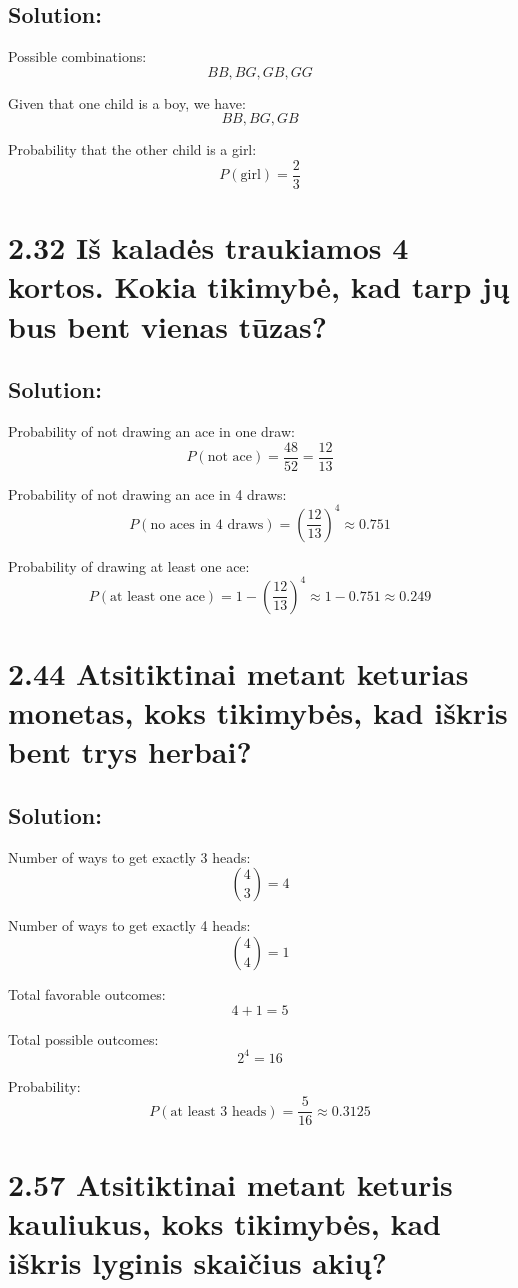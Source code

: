 \documentclass{article}
\begin{document}
{\subsection*{Solution:}
Possible combinations:
\[
BB, BG, GB, GG
\]

Given that one child is a boy, we have:
\[
BB, BG, GB
\]

Probability that the other child is a girl:
\[
P(\text{girl}) = \frac{2}{3}
\]

\section*{2.32 Iš kaladės traukiamos 4 kortos. Kokia tikimybė, kad tarp jų bus bent vienas tūzas?}
\subsection*{Solution:}
Probability of not drawing an ace in one draw:
\[
P(\text{not ace}) = \frac{48}{52} = \frac{12}{13}
\]

Probability of not drawing an ace in 4 draws:
\[
P(\text{no aces in 4 draws}) = \left(\frac{12}{13}\right)^4 \approx 0.751
\]

Probability of drawing at least one ace:
\[
P(\text{at least one ace}) = 1 - \left(\frac{12}{13}\right)^4 \approx 1 - 0.751 \approx 0.249
\]

\section*{2.44 Atsitiktinai metant keturias monetas, koks tikimybės, kad iškris bent trys herbai?}
\subsection*{Solution:}
Number of ways to get exactly 3 heads:
\[
\binom{4}{3} = 4
\]

Number of ways to get exactly 4 heads:
\[
\binom{4}{4} = 1
\]

Total favorable outcomes:
\[
4 + 1 = 5
\]

Total possible outcomes:
\[
2^4 = 16
\]

Probability:
\[
P(\text{at least 3 heads}) = \frac{5}{16} \approx 0.3125
\]

\section*{2.57 Atsitiktinai metant keturis kauliukus, koks tikimybės, kad iškris lyginis skaičius akių?}
}
\end{document}
